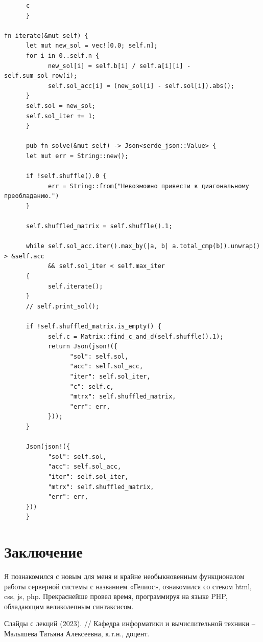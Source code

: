 \documentclass{article}
\begin{document}
\begin{lstlisting}
      c
      }

fn iterate(&mut self) {
      let mut new_sol = vec![0.0; self.n];
      for i in 0..self.n {
            new_sol[i] = self.b[i] / self.a[i][i] - self.sum_sol_row(i);
            self.sol_acc[i] = (new_sol[i] - self.sol[i]).abs();
      }
      self.sol = new_sol;
      self.sol_iter += 1;
      }

      pub fn solve(&mut self) -> Json<serde_json::Value> {
      let mut err = String::new();

      if !self.shuffle().0 {
            err = String::from("Невозможно привести к диагональному преобладанию.")
      }

      self.shuffled_matrix = self.shuffle().1;

      while self.sol_acc.iter().max_by(|a, b| a.total_cmp(b)).unwrap() > &self.acc
            && self.sol_iter < self.max_iter
      {
            self.iterate();
      }
      // self.print_sol();

      if !self.shuffled_matrix.is_empty() {
            self.c = Matrix::find_c_and_d(self.shuffle().1);
            return Json(json!({
                  "sol": self.sol,
                  "acc": self.sol_acc,
                  "iter": self.sol_iter,
                  "c": self.c,
                  "mtrx": self.shuffled_matrix,
                  "err": err,
            }));
      }

      Json(json!({
            "sol": self.sol,
            "acc": self.sol_acc,
            "iter": self.sol_iter,
            "mtrx": self.shuffled_matrix,
            "err": err,
      }))
      }
\end{lstlisting}

\section{Заключение}
Я познакомился с новым для меня и крайне необыкновенным функционалом работы серверной системы с названием «Гелиос», ознакомился со стеком html, css, js, php. Прекраснейше провел время, программируя на языке PHP, обладающим великолепным синтаксисом.

\begin{thebibliography}{9}
    Слайды с лекций (2023). // Кафедра информатики и вычислительной техники -- Малышева Татьяна Алексеевна, к.т.н., доцент.
\end{thebibliography} 
\end{document}
